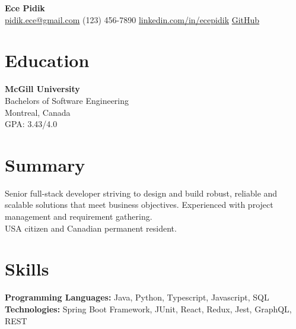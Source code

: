 \documentclass[a4paper,10pt]{article}
\begin{document}
\begin{center}
    {\fontsize{20}{20}\textbf{Ece Pidik}\selectfont} \\
    \vspace{0.2cm}
    \href{mailto:pidik.ece@gmail.com}{pidik.ece@gmail.com} \textbullet{} 
    (123) 456-7890 \textbullet{} 
    \href{https://www.linkedin.com/in/ecepidik}{linkedin.com/in/ecepidik} \textbullet{} 
    \href{https://github.com/yourusername}{GitHub}
\end{center}

\vspace{-0.2cm}
\noindent
\begin{minipage}[t]{0.35\textwidth}
    \section*{Education}
    \noindent
    \textbf {\large McGill University} \\
    Bachelors of Software Engineering\\
    Montreal, Canada \\
    GPA: 3.43/4.0
\end{minipage}%
\hfill
\begin{minipage}[t]{0.60\textwidth}
    \section*{Summary}
    \noindent
    Senior full-stack developer striving to design and build robust, reliable and scalable solutions that meet business objectives. Experienced with project management and requirement gathering. \\
USA citizen and Canadian permanent resident.
\end{minipage}

\vspace{-0.2cm}
\section*{Skills}
\noindent
\textbf{Programming Languages:} Java, Python, Typescript, Javascript, SQL \\
\textbf{Technologies:} Spring Boot Framework, JUnit, React, Redux, Jest, GraphQL, REST

\vspace{-0.2cm}
\end{document}
